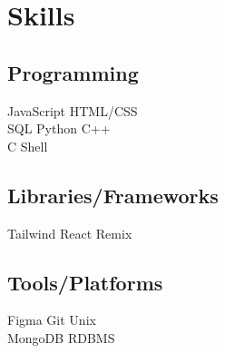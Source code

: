\documentclass[]{plushcv}
\begin{document}
\begin{minipage}[t]{0.70\textwidth}
%
%

\end{minipage} 
\hfill
\begin{minipage}[t]{0.25\textwidth} 


\section{Skills}
\subsection{Programming}
\sectionsep
 JavaScript \textbullet{}  HTML/CSS  \\ SQL \textbullet{} Python \textbullet{} C++  \\ C  \textbullet{}  Shell 
\sectionsep
\sectionsep
\subsection{Libraries/Frameworks}
\sectionsep
Tailwind \textbullet{} React \textbullet{} Remix\\
\sectionsep
\sectionsep
\subsection{Tools/Platforms}
\sectionsep
Figma \textbullet{} Git \textbullet{} Unix  \\ \textbullet{}  MongoDB \textbullet{} RDBMS

\sectionsep


\end{minipage}
\end{document}
